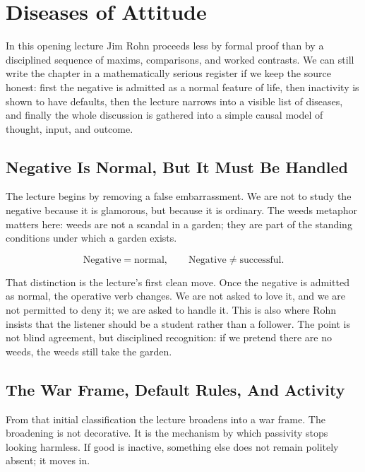 \chapter{Diseases of Attitude}

In this opening lecture Jim Rohn proceeds less by formal proof than by a disciplined sequence of maxims, comparisons, and worked contrasts. We can still write the chapter in a mathematically serious register if we keep the source honest: first the negative is admitted as a normal feature of life, then inactivity is shown to have defaults, then the lecture narrows into a visible list of diseases, and finally the whole discussion is gathered into a simple causal model of thought, input, and outcome.

\section{Negative Is Normal, But It Must Be Handled}

The lecture begins by removing a false embarrassment. We are not to study the negative because it is glamorous, but because it is ordinary. The weeds metaphor matters here: weeds are not a scandal in a garden; they are part of the standing conditions under which a garden exists.

\begin{equation}
\text{Negative} = \text{normal}, \qquad \text{Negative} \neq \text{successful}.
\end{equation}

That distinction is the lecture's first clean move. Once the negative is admitted as normal, the operative verb changes. We are not asked to love it, and we are not permitted to deny it; we are asked to handle it. This is also where Rohn insists that the listener should be a student rather than a follower. The point is not blind agreement, but disciplined recognition: if we pretend there are no weeds, the weeds still take the garden.

\section{The War Frame, Default Rules, And Activity}

From that initial classification the lecture broadens into a war frame. The broadening is not decorative. It is the mechanism by which passivity stops looking harmless. If good is inactive, something else does not remain politely absent; it moves in.

